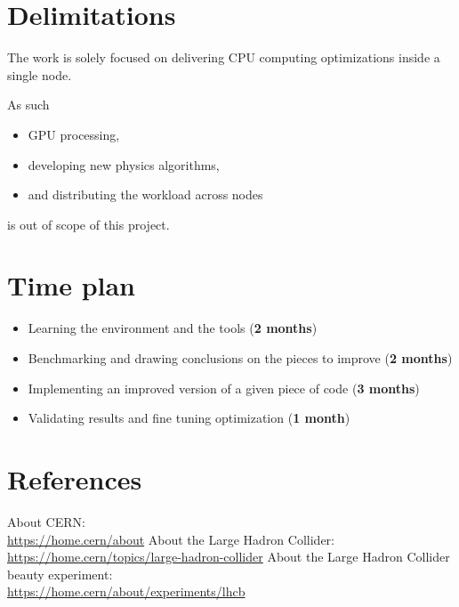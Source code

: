 \documentclass[12pt]{article}
\begin{document}

	
	
	
	\section{Delimitations}

	The work is solely focused on delivering CPU computing optimizations inside a single node. 
	
	As such
	\begin{itemize}
		\item GPU processing,
		\item developing new physics algorithms,
		\item and distributing the workload across nodes
	\end{itemize}
	is out of scope of this project.


	\section{Time plan}
		
	\begin{itemize}
		\item Learning the environment and the tools (\textbf{2 months})
		\item Benchmarking and drawing conclusions on the pieces to improve (\textbf{2 months})
		\item Implementing an improved version of a given piece of code (\textbf{3 months})
		\item Validating results and fine tuning optimization (\textbf{1 month})
	\end{itemize}

	
	\section{References}
	
	\begin{thebibliography}{asd}
		 About CERN: \\
			\url{https://home.cern/about}
		 About the Large Hadron Collider: \\
			\url{https://home.cern/topics/large-hadron-collider}
		 About the Large Hadron Collider beauty experiment: \\
			\url{https://home.cern/about/experiments/lhcb}
	\end{thebibliography}
\end{document}
